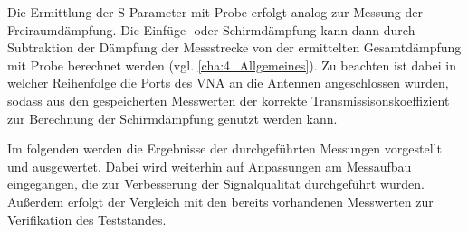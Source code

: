 Die Ermittlung der S-Parameter mit Probe erfolgt analog zur Messung der Freiraumdämpfung. Die Einfüge- oder Schirmdämpfung kann dann durch Subtraktion der Dämpfung der Messstrecke von der ermittelten Gesamtdämpfung mit Probe berechnet werden (vgl. \Abschnitt\ref{cha:4_Allgemeines}). Zu beachten ist dabei in welcher Reihenfolge die Ports des VNA an die Antennen angeschlossen wurden, sodass aus den gespeicherten Messwerten der korrekte Transmissisonskoeffizient zur Berechnung der Schirmdämpfung genutzt werden kann.
\par
\vspace{\linespace}
Im folgenden \Abschnitt werden die Ergebnisse der durchgeführten Messungen vorgestellt und ausgewertet. Dabei wird weiterhin auf Anpassungen am Messaufbau eingegangen, die zur Verbesserung der Signalqualität durchgeführt wurden. Außerdem erfolgt der Vergleich mit den bereits vorhandenen Messwerten zur Verifikation des Teststandes.














